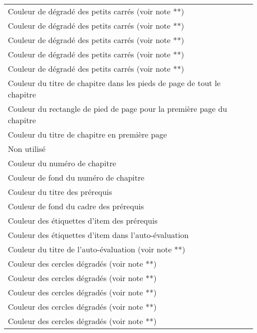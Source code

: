 \documentclass[nocrop]{sesamanuel}
\begin{document}
\begin{longtable}{@{}llp{8cm}@{}}
  Couleur de dégradé des petits carrés (voir note **) \\
  {ChapterNumSquare2Color}{H2}
  Couleur de dégradé des petits carrés (voir note **) \\
  {ChapterNumSquare3Color}{H4}
  Couleur de dégradé des petits carrés (voir note **) \\
  {ChapterNumSquare4Color}{*}%
  Couleur de dégradé des petits carrés (voir note **) \\
  {ChapterNumSquare5Color}{*}%
  Couleur de dégradé des petits carrés (voir note **) \\
  {FootTitleHeadColor}{*}%
  Couleur du titre de chapitre dans les pieds de page de tout le
  chapitre \\
  {FirstChapterFootColor}{*}%
  Couleur du rectangle de pied de page pour la première page du
  chapitre \\
  {ChapterTitleColor}{B1}
  Couleur du titre de chapitre en première page \\
  {ChapAppColor}{Blanc}
  Non utilisé \\
  {ChapterNumColor}{Blanc}
  Couleur du numéro de chapitre \\
  {ChapterNumFrameColor}{*}%
  Couleur de fond du numéro de chapitre \\
  {PrerequisTitleColor}{B2}
  Couleur du titre des prérequis \\
  {PrerequisBkgColor}{A4}
  Couleur de fond du cadre des prérequis \\
  {PrerequisItemColor}{B2}
  Couleur des étiquettes d'item des prérequis \\
  {AEItemColor}{B2}
  Couleur des étiquettes d'item dans l'auto-évaluation \\
  {AETitleFrame0Color}{Blanc}
  Couleur du titre de l'auto-évaluation (voir note **)\\
  {AETitleFrame1Color}{B2}
  Couleur des cercles dégradés (voir note **) \\
  {AETitleFrame2Color}{B3}
  Couleur des cercles dégradés (voir note **) \\
  {AETitleFrame3Color}{A4}
  Couleur des cercles dégradés (voir note **) \\
  {AETitleFrame4Color}{A3}
  Couleur des cercles dégradés (voir note **) \\
  {AETitleFrame5Color}{A2}
  Couleur des cercles dégradés (voir note **) \\

\end{longtable}
\end{document}
